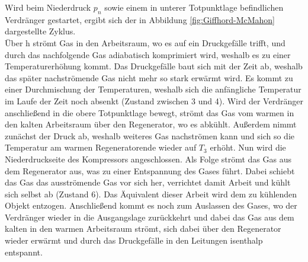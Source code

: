 \documentclass[parskip=half, a4paper,twoside,final]{article}
\begin{document}
Wird beim Niederdruck $p_n$ sowie einem in unterer Totpunktlage befindlichen Verdränger gestartet, ergibt sich der in Abbildung \ref{fig:Giffhord-McMahon} dargestellte Zyklus. \\
Über h strömt Gas in den Arbeitsraum, wo es auf ein Druckgefälle trifft, und durch das nachfolgende Gas adiabatisch komprimiert wird, weshalb es zu einer Temperaturerhöhung kommt. Das Druckgefälle baut sich mit der Zeit ab, weshalb das später nachströmende Gas nicht mehr so stark erwärmt wird. Es kommt zu einer Durchmischung der Temperaturen, weshalb sich die anfängliche Temperatur im Laufe der Zeit noch absenkt (Zustand zwischen 3 und 4). Wird der Verdränger anschließend in die obere Totpunktlage bewegt, strömt das Gas vom warmen in den kalten Arbeitsraum  über den Regenerator, wo es abkühlt. Außerdem nimmt zunächst der Druck ab, weshalb weiteres Gas nachströmen kann und sich so die Temperatur am warmen Regeneratorende wieder auf $T_3$ erhöht. Nun wird die Niederdruckseite des Kompressors angeschlossen. Als Folge strömt das Gas aus dem Regenerator aus, was zu einer Entspannung des Gases führt. Dabei schiebt das Gas das ausströmende Gas vor sich her, verrichtet damit Arbeit und kühlt sich selbst ab (Zustand 6). Das Äquivalent dieser Arbeit wird dem zu kühlenden Objekt entzogen. Anschließend kommt es noch zum Auslassen des Gases, wo der Verdränger wieder in die Ausgangslage zurückkehrt und dabei das Gas aus dem kalten in den warmen Arbeitsraum strömt, sich dabei über den Regenerator wieder erwärmt und durch das Druckgefälle in den Leitungen isenthalp entspannt.
\end{document}
